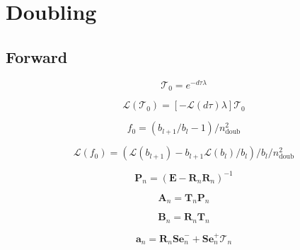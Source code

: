 %
\section{Doubling}
\label{sec:doubling}


\subsection{Forward}
\label{sec:doubling-forward}

\begin{equation}
\mathcal{T}_{0} = e^{-d\tau \lambda}
\label{eq:doubling-forward-script_T}
\end{equation}

\begin{equation}
\mathcal{L}(\mathcal{T}_{0}) = \left[-\mathcal{L}(d\tau) \lambda \right] \mathcal{T}_{0}
\label{eq:doubling-forward-script_T_l}
\end{equation}


\begin{equation}
f_{0} = (b_{l+1} / b_{l} - 1) / n_{\mathrm{doub}}^{2}
\label{eq:doubling-forward-f}
\end{equation}

\begin{equation}
\mathcal{L}(f_{0}) = (\mathcal{L}(b_{l+1}) - b_{l+1}\mathcal{L}(b_{l}) / b_{l}) / b_{l} / n_{\mathrm{doub}}^{2}
\label{eq:doubling-forward-f_l}
\end{equation}


\begin{equation}
\mathbf{P}_{n} = (\mathbf{E} - \mathbf{R}_{n}\mathbf{R}_{n})^{-1}
\label{eq:doubling-forward-P}
\end{equation}

\begin{equation}
\mathbf{A}_{n} = \mathbf{T}_{n}\mathbf{P}_{n}
\label{eq:doubling-forward-A}
\end{equation}

\begin{equation}
\mathbf{B}_{n} = \mathbf{R}_{n}\mathbf{T}_{n}
\label{eq:doubling-forward-B}
\end{equation}

\begin{equation}
\mathbf{a}_{n} = \mathbf{R}_{n}\mathbf{Se}^{-}_{n} + \mathbf{Se}^{+}_{n}\mathcal{T}_{n}
\label{eq:doubling-forward-a}
\end{equation}

